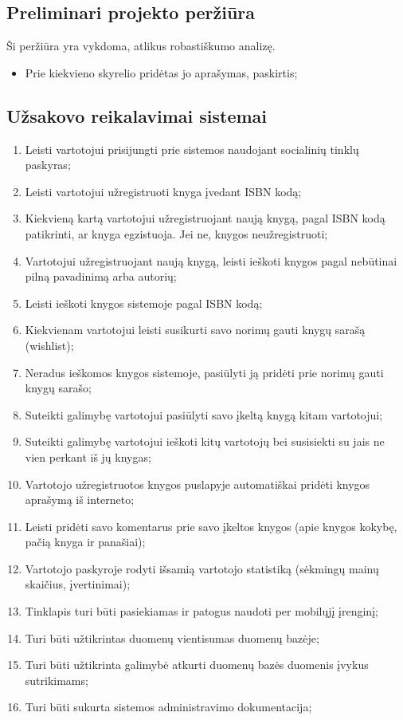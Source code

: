 \documentclass{VUMIFPSkursinis}
\begin{document}
	\subsection{Preliminari projekto peržiūra}
		Ši peržiūra yra vykdoma, atlikus robastiškumo analizę.	%
		\begin{itemize}
			\item Prie kiekvieno skyrelio pridėtas jo aprašymas, paskirtis;
		\end{itemize}


	
\setcounter{secnumdepth}{0}
\subsection{Užsakovo reikalavimai sistemai}
\begin{enumerate}
	\item Leisti vartotojui prisijungti prie sistemos naudojant socialinių tinklų paskyras;
	\item Leisti vartotojui užregistruoti knyga įvedant ISBN kodą;
	\item Kiekvieną kartą vartotojui užregistruojant naują knygą, pagal ISBN kodą patikrinti,
		ar knyga egzistuoja. Jei ne, knygos neužregistruoti;
	\item Vartotojui užregistruojant naują knygą, leisti ieškoti knygos pagal 
		nebūtinai pilną pavadinimą arba autorių;
	\item Leisti ieškoti knygos sistemoje pagal ISBN kodą;
	\item Kiekvienam vartotojui leisti susikurti savo norimų gauti knygų sarašą (wishlist);
	\item Neradus ieškomos knygos sistemoje, pasiūlyti ją pridėti prie norimų gauti knygų sarašo;
	\item Suteikti galimybę vartotojui pasiūlyti savo įkeltą knygą kitam vartotojui;
	\item Suteikti galimybę vartotojui ieškoti kitų vartotojų bei susisiekti su jais ne vien
		perkant iš jų knygas;
	\item Vartotojo užregistruotos knygos puslapyje automatiškai pridėti knygos aprašymą
		iš interneto;
	\item Leisti pridėti savo komentarus prie savo įkeltos knygos (apie knygos kokybę,
		pačią knyga ir panašiai);
	\item Vartotojo paskyroje rodyti išsamią vartotojo statistiką (sėkmingų mainų skaičius,
		įvertinimai);
	\item Tinklapis turi būti pasiekiamas ir patogus naudoti per mobilųjį įrenginį;
	\item Turi būti užtikrintas duomenų vientisumas duomenų bazėje;
	\item Turi būti užtikrinta galimybė atkurti duomenų bazės duomenis įvykus sutrikimams;
	\item Turi būti sukurta sistemos administravimo dokumentacija;
\end{enumerate}
\end{document}
